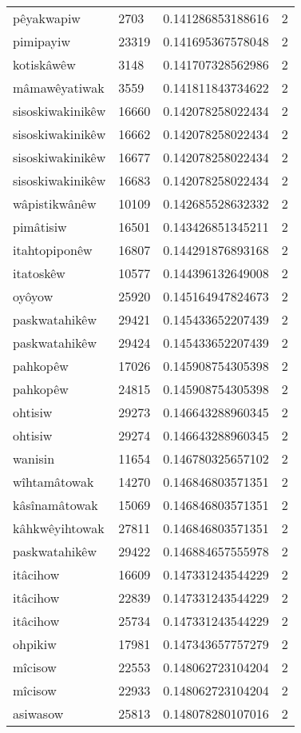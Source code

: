 \begin{longtable}{llll}
pêyakwapiw & 2703 & 0.141286853188616 & 2 \\
pimipayiw & 23319 & 0.141695367578048 & 2 \\
kotiskâwêw & 3148 & 0.141707328562986 & 2 \\
mâmawêyatiwak & 3559 & 0.141811843734622 & 2 \\
sisoskiwakinikêw & 16660 & 0.142078258022434 & 2 \\
sisoskiwakinikêw & 16662 & 0.142078258022434 & 2 \\
sisoskiwakinikêw & 16677 & 0.142078258022434 & 2 \\
sisoskiwakinikêw & 16683 & 0.142078258022434 & 2 \\
wâpistikwânêw & 10109 & 0.142685528632332 & 2 \\
pimâtisiw & 16501 & 0.143426851345211 & 2 \\
itahtopiponêw & 16807 & 0.144291876893168 & 2 \\
itatoskêw & 10577 & 0.144396132649008 & 2 \\
oyôyow & 25920 & 0.145164947824673 & 2 \\
paskwatahikêw & 29421 & 0.145433652207439 & 2 \\
paskwatahikêw & 29424 & 0.145433652207439 & 2 \\
pahkopêw & 17026 & 0.145908754305398 & 2 \\
pahkopêw & 24815 & 0.145908754305398 & 2 \\
ohtisiw & 29273 & 0.146643288960345 & 2 \\
ohtisiw & 29274 & 0.146643288960345 & 2 \\
wanisin & 11654 & 0.146780325657102 & 2 \\
wîhtamâtowak & 14270 & 0.146846803571351 & 2 \\
kâsînamâtowak & 15069 & 0.146846803571351 & 2 \\
kâhkwêyihtowak & 27811 & 0.146846803571351 & 2 \\
paskwatahikêw & 29422 & 0.146884657555978 & 2 \\
itâcihow & 16609 & 0.147331243544229 & 2 \\
itâcihow & 22839 & 0.147331243544229 & 2 \\
itâcihow & 25734 & 0.147331243544229 & 2 \\
ohpikiw & 17981 & 0.147343657757279 & 2 \\
mîcisow & 22553 & 0.148062723104204 & 2 \\
mîcisow & 22933 & 0.148062723104204 & 2 \\
asiwasow & 25813 & 0.148078280107016 & 2 \\

\end{longtable}
